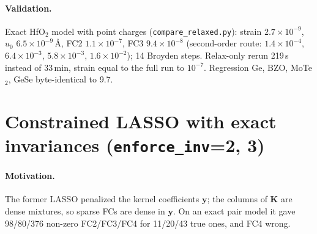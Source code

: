 \documentclass[11pt,a4paper]{article}
\newcommand{\bK}{\mathbf K}
\newcommand{\by}{\mathbf y}
\newcommand{\code}[1]{\texttt{#1}}
\begin{document}
\paragraph{Validation.} Exact HfO$_2$ model with point charges (\code{compare\_relaxed.py}): strain
$2.7\times10^{-9}$, $u_0$ $6.5\times10^{-9}$\,\AA, FC2 $1.1\times10^{-7}$, FC3 $9.4\times10^{-8}$ (second-order route:
$1.4\times10^{-4}$, $6.4\times10^{-3}$, $5.8\times10^{-3}$, $1.6\times10^{-2}$); 14 Broyden steps. Relax-only rerun 219\,s
instead of 33\,min, strain equal to the full run to $10^{-7}$. Regression Ge, BZO, MoTe$_2$, GeSe
byte-identical to 9.7.

\section{\texorpdfstring{Constrained LASSO with exact invariances (\code{enforce\_inv}=2, 3)}{Constrained LASSO with exact invariances (enforce\_inv=2, 3)}}\label{sec:lasso}
\paragraph{Motivation.} The former LASSO penalized the kernel coefficients $\by$; the columns of $\bK$ are
dense mixtures, so sparse FCs are dense in $\by$. On an exact pair model it gave 98/80/376 non-zero
FC2/FC3/FC4 for 11/20/43 true ones, and FC4 wrong.
\end{document}
